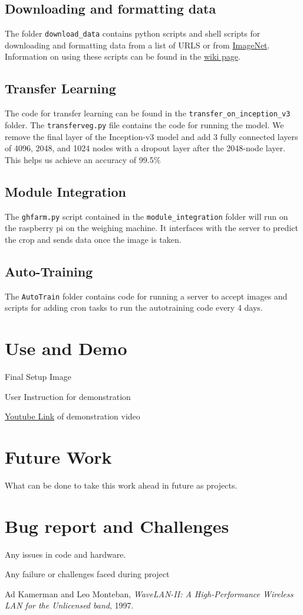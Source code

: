 \documentclass[a4paper,12pt,oneside]{book}
\begin{document}
\subsection{Downloading and formatting data}
The folder \texttt{download\_data} contains python scripts and shell scripts for downloading and formatting data from a list of URLS or from \href{http://www.image-net.org/}{ImageNet}. Information on using these scripts can be found in the \href{https://github.com/eYSIP-2017/eYSIP-2017_Vegetable-Identification-Using-Transfer-Learning/wiki/Downloading-and-formatting-data.}{wiki page}.

\subsection{Transfer Learning}
The code for transfer learning can be found in the \texttt{transfer\_on\_inception\_v3} folder. The \texttt{transferveg.py} file contains the code for running the model.
We remove the final layer of the Inception-v3 model and add 3 fully connected layers of 4096, 2048, and 1024 nodes with a dropout layer after the 2048-node layer.
This helps us achieve an accuracy of 99.5\%

\subsection{Module Integration}
The \texttt{ghfarm.py} script contained in the \texttt{module\_integration} folder will run on the raspberry pi on the weighing machine. It interfaces with the server to predict the crop and sends data once the image is taken.

\subsection{Auto-Training}
The \texttt{AutoTrain} folder contains code for running a server to accept images and scripts for adding cron tasks to run the autotraining code every 4 days.


\section{Use and Demo}
Final Setup Image

User Instruction for demonstration

\href{http://www.youtube.com}{Youtube Link} of demonstration video 

\section{Future Work}
What can be done to take this work ahead in future as projects.

\section{Bug report and Challenges}
Any issues in code and hardware.

Any failure or challenges faced during project

\begin{thebibliography}{li}
Ad Kamerman and Leo Monteban,
{\em WaveLAN-II: A High-Performance Wireless LAN for the Unlicensed band},
1997.

\end{thebibliography}
\end{document}

